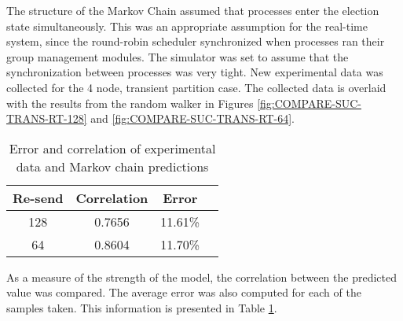 The structure of the Markov Chain assumed that processes enter the election state simultaneously.
This was an appropriate assumption for the real-time system, since the round-robin scheduler synchronized when processes ran their group management modules.
The simulator was set to assume that the synchronization between processes was very tight.
New experimental data was collected for the 4 node, transient partition case.
The collected data is overlaid with the results from the random walker in Figures \ref{fig:COMPARE-SUC-TRANS-RT-128} and \ref{fig:COMPARE-SUC-TRANS-RT-64}.

\begin{table}
\caption{Error and correlation of experimental data and Markov chain predictions}
\label{tab:STAT-DATA}
\centering
\begin{tabular}{|c||c|c|c|}
\hline
Re-send & Correlation & Error \\ \hline
128 & 0.7656 & 11.61\% \\ \hline
64 & 0.8604 & 11.70\% \\ \hline
\end{tabular}
\end{table}

As a measure of the strength of the model, the correlation between the predicted value was compared.
The average error was also computed for each of the samples taken.
This information is presented in Table \ref{tab:STAT-DATA}.
